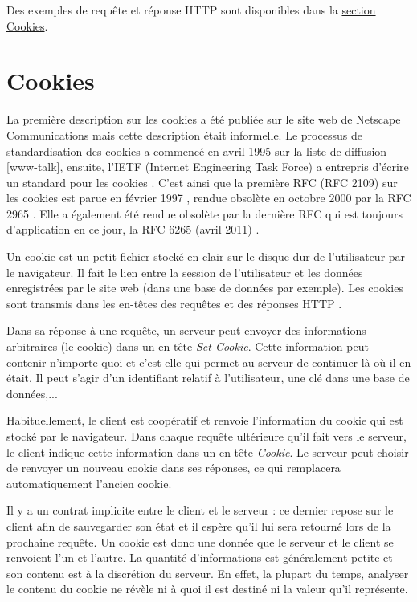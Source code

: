 Des exemples de requête et réponse HTTP sont disponibles dans la \hyperref[http-request-example]{section Cookies}.

	
\section{Cookies}
\label{http-cookies-expl}
La première description sur les cookies a été publiée sur le site web de Netscape Communications mais cette description était informelle. Le processus de standardisation des cookies a commencé en avril 1995 sur la liste de diffusion [www-talk], ensuite, l'IETF (Internet Engineering Task Force) a entrepris d'écrire un standard pour les cookies \cite{Kristol:2001:HCS:502152.502153}.
C'est ainsi que la première RFC (RFC 2109) sur les cookies est parue en février 1997 \cite{IETF_RFC2109}, rendue obsolète en octobre 2000 par la RFC 2965 \cite{IETF_RFC2965}. Elle a également été rendue obsolète par la dernière RFC qui est toujours d'application en ce jour, la RFC 6265 (avril 2011) \cite{IETF_RFC6265}.
\newline

Un cookie est un petit fichier stocké en clair sur le disque dur de l'utilisateur par le navigateur. Il fait le lien entre la session de l'utilisateur et les données enregistrées par le site web (dans une base de données par exemple). Les cookies sont transmis dans les en-têtes des requêtes et des réponses HTTP \cite{IETF_RFC6265}.

Dans sa réponse à une requête, un serveur peut envoyer des informations arbitraires (le cookie) dans un en-tête \textit{Set-Cookie}. Cette information peut contenir n'importe quoi et c'est elle qui permet au serveur de continuer là où il en était. Il peut s'agir d'un identifiant relatif à l'utilisateur, une clé dans une base de données,...

Habituellement, le client est coopératif et renvoie l'information du cookie qui est stocké par le navigateur. Dans chaque requête ultérieure qu'il fait vers le serveur, le client indique cette information dans un en-tête \textit{Cookie}. Le serveur peut choisir de renvoyer un nouveau cookie dans ses réponses, ce qui remplacera automatiquement l'ancien cookie.
\newline

Il y a un contrat implicite entre le client et le serveur : ce dernier repose sur le client afin de sauvegarder son état et il espère qu'il lui sera retourné lors de la prochaine requête.
Un cookie est donc une donnée que le serveur et le client se renvoient l'un et l'autre. La quantité d'informations est généralement petite et son contenu est à la discrétion du serveur. En effet, la plupart du temps, analyser le contenu du cookie ne révèle ni à quoi il est destiné ni la valeur qu'il représente.

